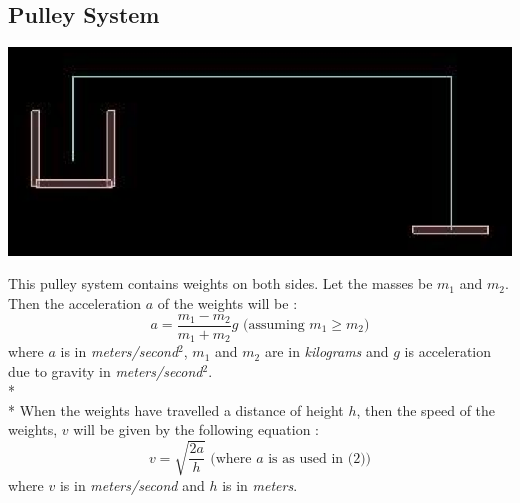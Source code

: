 \documentclass[11pt]{article}
\begin{document}
\subsection{Pulley System}
\begin{center}
\includegraphics[scale=0.5]{pulley}
\end{center}
This pulley\cite{pulley} system contains weights on both sides. Let the masses be $m_1$ and $m_2$. Then the acceleration $a$ of the weights will be :
\begin{equation}
                                                   a = \frac{m_1 - m_2}{m_1 + m_2}g \mbox{ (assuming $m_1 \geq m_2$)}
\end{equation}
where $a$ is in \emph{meters/second$^2$}, $m_1$ and $m_2$ are in \emph{kilograms} and $g$ is acceleration due to gravity in \emph{meters/second$^2$}.\\*\\*
When the weights have travelled a distance of height $h$, then the speed of the weights, $v$ will be given by the following equation :
\begin{equation}
                                                 v = \sqrt{\frac{2a}{h}} \mbox{ (where $a$ is as used in (2))}
\end{equation}
where $v$ is in \emph{meters/second} and $h$ is in \emph{meters}.
\end{document}

